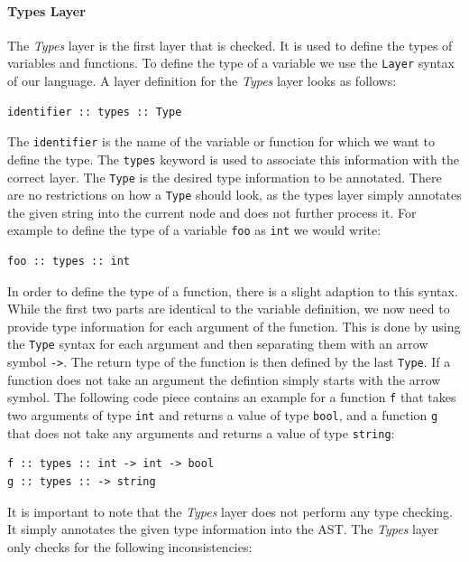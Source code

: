 \documentclass[acmsmall, review, screen]{acmart}
\begin{document}
\paragraph{Types Layer}
The \textit{Types} layer is the first layer that is checked. It is used to define the types of variables and functions. To define the type of a variable we use the \texttt{Layer} syntax of our language. A layer definition for the \textit{Types} layer looks as follows:

\begin{lstlisting}
identifier :: types :: Type
\end{lstlisting}

The \texttt{identifier} is the name of the variable or function for which we want to define the type. The \texttt{types} keyword is used to associate this information with the correct layer. The \texttt{Type} is the desired type information to be annotated. There are no restrictions on how a \texttt{Type} should look, as the types layer simply annotates the given string into the current node and does not further process it. For example to define the type of a variable \texttt{foo} as \texttt{int} we would write:

\begin{lstlisting}
foo :: types :: int
\end{lstlisting}

In order to define the type of a function, there is a slight adaption to this syntax. While the first two parts are identical to the variable definition, we now need to provide type information for each argument of the function. This is done by using the \texttt{Type} syntax for each argument and then separating them with an arrow symbol \texttt{->}. The return type of the function is then defined by the last \texttt{Type}. If a function does not take an argument the defintion simply starts with the arrow symbol. The following code piece contains an example for a function \texttt{f} that takes two arguments of type \texttt{int} and returns a value of type \texttt{bool}, and a function \texttt{g} that does not take any arguments and returns a value of type \texttt{string}:

\begin{lstlisting}
f :: types :: int -> int -> bool
g :: types :: -> string
\end{lstlisting}

It is important to note that the \textit{Types} layer does not perform any type checking. It simply annotates the given type information into the AST. The \textit{Types} layer only checks for the following inconsistencies:
\end{document}

